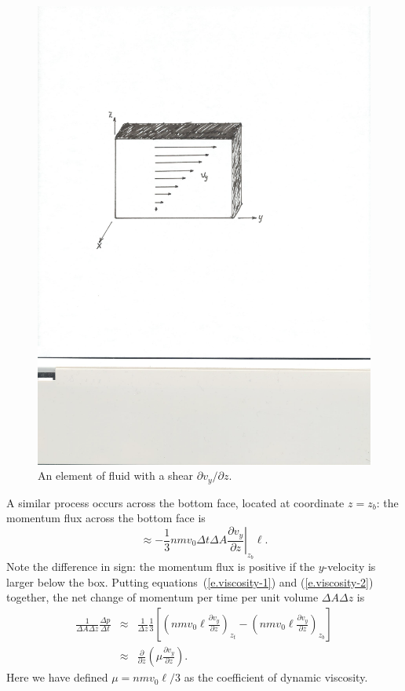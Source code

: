 \begin{figure}[htbp]
\includegraphics[width=\textwidth]{shear-diagram}
\caption{An element of fluid with a shear $\partial v_{y}/\partial z$.}\label{f.shear-diagram}
\end{figure}

A similar process occurs across the bottom face, located at coordinate $z=z_{b}$: the momentum flux across the bottom face is
\begin{equation}\label{e.viscosity-2} 
\approx -\frac{1}{3} n m v_{0} \Delta t\Delta A \left.\frac{\partial v_{y}}{\partial z}\right|_{z_{b}}\ell.
\end{equation}
Note the difference in sign: the momentum flux is positive if the $y$-velocity is larger below the box.  Putting equations~(\ref{e.viscosity-1}) and (\ref{e.viscosity-2}) together, the net change of momentum per time per unit volume $\Delta A\Delta z$ is
\begin{eqnarray}
\frac{1}{\Delta A\Delta z}\frac{\Delta p}{\Delta t} &\approx&  \frac{1}{\Delta z} \frac{1}{3} \left[\left(n m v_{0}\ell\frac{\partial v_{y}}{\partial z}\right)_{z_{t}} - \left(n m v_{0} \ell\frac{\partial v_{y}}{\partial z}\right)_{z_{b}}\right]\nonumber\\
 &\approx&   \frac{\partial}{\partial z}\left( \mu \frac{\partial v_{y}}{\partial z}\right).
\label{e.viscosity-3}
\end{eqnarray}
Here we have defined $\mu = nmv_{0}\ell/3 $ as the coefficient of dynamic viscosity. 

